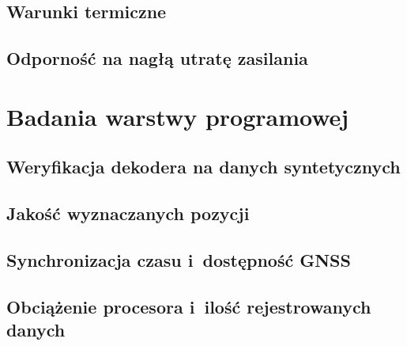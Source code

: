 \subsection{Warunki termiczne}
\label{sec:termika}

\subsection{Odporność na nagłą utratę zasilania}
\label{sec:utrata_zasilania}

\section{Badania warstwy programowej}
\label{sec:badania_program}

\subsection{Weryfikacja dekodera na danych syntetycznych}
\label{sec:dane_syntetyczne}

\subsection{Jakość wyznaczanych pozycji}
\label{sec:jakosc_pozycji}

\subsection{Synchronizacja czasu i~dostępność GNSS}
\label{sec:czas_gnss}

\subsection{Obciążenie procesora i~ilość rejestrowanych danych}
\label{sec:obciazenie}
